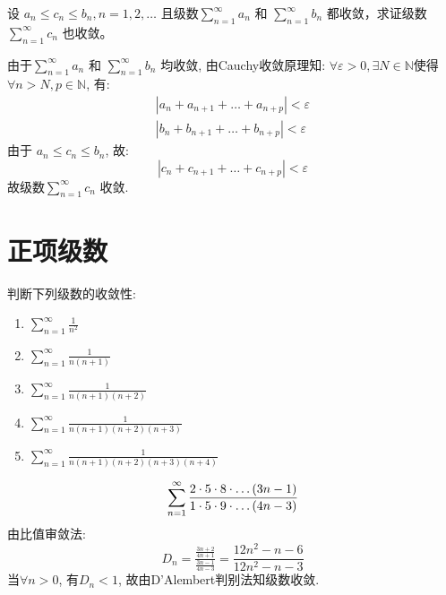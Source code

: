 \begin{problem}
    设 \(a_n \leq c_n \leq b_n, n = 1, 2, \dots\)
    且级数\(\sum_{n=1}^{\infty} a_n\) 和 \(\sum_{n=1}^{\infty}
    b_n\) 都收敛，求证级数
    \(\sum_{n=1}^{\infty} c_n\) 也收敛。
\end{problem}

\begin{solution}
    由于\(\sum_{n=1}^{\infty} a_{n}\) 和 \(\sum_{n=1}^{\infty} b_{n}\)
    均收敛, 由Cauchy收敛原理知: \(\forall \varepsilon > 0, \exists N \in
    \mathbb{N}\)使得\(\forall n > N, p \in \mathbb{N}\), 有:
    \begin{align*}
        \left| a_{n} + a_{n+1} + \dots + a_{n+p} \right| <
        \varepsilon \\
        \left| b_{n} + b_{n+1} + \dots + b_{n+p} \right| < \varepsilon
    \end{align*}
    由于
    \(a_{n} \leq c_{n} \leq b_{n}\), 故:
    \[
        \left| c_{n} + c_{n+1} + \dots + c_{n+p} \right| < \varepsilon
    \]
    故级数\(\sum_{n=1}^{\infty} c_{n}\) 收敛.
\end{solution}

\begin{problem}

\end{problem}

\section{正项级数}
\begin{problem}
    判断下列级数的收敛性:
    \begin{enumerate}
        \item \(\sum_{n=1}^{\infty} \frac{1}{n^2}\)
        \item \(\sum_{n=1}^{\infty} \frac{1}{n(n+1)}\)
        \item \(\sum_{n=1}^{\infty} \frac{1}{n(n+1)(n+2)}\)
        \item \(\sum_{n=1}^{\infty} \frac{1}{n(n+1)(n+2)(n+3)}\)
        \item \(\sum_{n=1}^{\infty} \frac{1}{n(n+1)(n+2)(n+3)(n+4)}\)
    \end{enumerate}
\end{problem}
\[
    \sum_{n=1}^{\infty} \frac{2 \cdot 5 \cdot 8 \cdot \dots
    (3n-1)}{1 \cdot 5 \cdot 9 \cdot \dots (4n-3)} \\
\]
由比值审敛法:
\[
    D_{n} = \tfrac{\tfrac{3n+2}{4n+1}}{\tfrac{3n-1}{4n-3}} =
    \frac{12n^{2}-n-6}{12n^{2}-n-3}
\]
当\(\forall n > 0\), 有\(D_{n} < 1\), 故由D'Alembert判别法知级数收敛.

